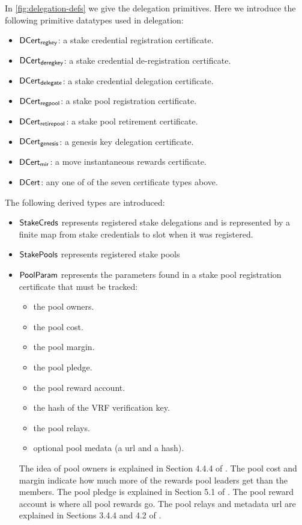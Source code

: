 In \cref{fig:delegation-defs} we give the delegation primitives.
Here we introduce the following primitive datatypes used in delegation:

\begin{itemize}
\item $\mathsf{DCert_{regkey}}$: a stake credential registration certificate.
\item $\mathsf{DCert_{deregkey}}$: a stake credential de-registration certificate.
\item $\mathsf{DCert_{delegate}}$: a stake credential delegation certificate.
\item $\mathsf{DCert_{regpool}}$: a stake pool registration certificate.
\item $\mathsf{DCert_{retirepool}}$: a stake pool retirement certificate.
\item $\mathsf{DCert_{genesis}}$: a genesis key delegation certificate.
\item $\mathsf{DCert_{mir}}$: a move instantaneous rewards certificate.
\item $\mathsf{DCert}$: any one of of the seven certificate types above.
\end{itemize}
The following derived types are introduced:
\begin{itemize}
\item $\mathsf{StakeCreds}$ represents registered stake delegations and is
  represented by a finite map from stake credentials to slot when it was
  registered.
\item$\mathsf{StakePools}$ represents registered stake pools
\item $\mathsf{PoolParam}$ represents the parameters found in a stake pool registration certificate
  that must be tracked:
  \begin{itemize}
    \item the pool owners.
    \item the pool cost.
    \item the pool margin.
    \item the pool pledge.
    \item the pool reward account.
    \item the hash of the VRF verification key.
    \item the pool relays.
    \item optional pool medata (a url and a hash).
  \end{itemize}
  The idea of pool owners is explained in Section 4.4.4 of \cite{delegation_design}.
  The pool cost and margin indicate how much more of the rewards pool leaders
  get than the members.
  The pool pledge is explained in Section 5.1 of \cite{delegation_design}.
  The pool reward account is where all pool rewards go.
  The pool relays and metadata url are explained in Sections
  3.4.4 and 4.2 of \cite{delegation_design}.
\end{itemize}


